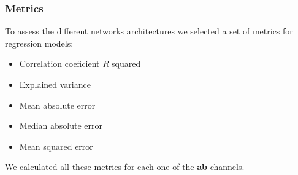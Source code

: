 \documentclass[
]{article}
\providecommand{\tightlist}{%
  \setlength{\itemsep}{0pt}\setlength{\parskip}{0pt}}
\begin{document}
\hypertarget{metrics}{%
\subsubsection{Metrics}\label{metrics}}

To assess the different networks architectures we selected a set of
metrics for regression models:

\begin{itemize}
\tightlist
\item
  Correlation coeficient \emph{R} squared
\item
  Explained variance
\item
  Mean absolute error
\item
  Median absolute error
\item
  Mean squared error
\end{itemize}

We calculated all these metrics for each one of the \textbf{ab}
channels.
\end{document}
